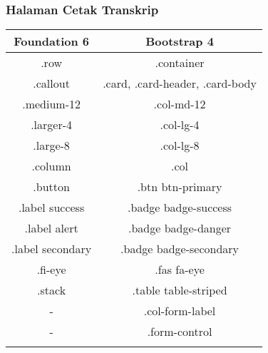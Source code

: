 \subsubsection{Halaman Cetak Transkrip}
\begin{tabular}{||c|c||} 
	\hline
	\textbf{Foundation 6} & \textbf{Bootstrap 4}  \\ [0.5ex] 
	\hline\hline
	.row &   .container\\ 
	\hline	
	.callout &  .card, .card-header, .card-body \\
	\hline	
	.medium-12 &  .col-md-12 \\
	\hline	
	.larger-4 &  .col-lg-4 \\
	\hline
	.large-8 &  .col-lg-8 \\
	\hline
	.column &  .col \\	
	\hline	
	.button &  .btn btn-primary\\
	\hline	
	.label success &  .badge badge-success \\
	\hline	
	.label alert & .badge badge-danger  \\
	\hline	
	.label secondary & .badge badge-secondary  \\
	\hline	
	.fi-eye &  .fas fa-eye \\	
	\hline	
	.stack & .table table-striped  \\
	\hline	
	- & .col-form-label  \\ 
	\hline	
	- & .form-control  \\
	\hline	
	&   \\ [1ex] 
	\hline
\end{tabular}


